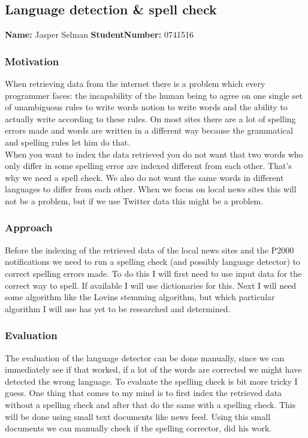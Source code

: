 \subsection{Language detection \& spell check}
\textbf{Name:} Jasper Selman \indent \textbf{StudentNumber:} 0741516

\subsubsection*{Motivation}
When retrieving data from the internet there is a problem which every programmer faces: the incapability of the human being to agree on one single set of unambiguous rules to write words notion to write words and the ability to actually write according to these rules. On most sites there are a lot of spelling errors made and words are written in a different way because the grammatical and spelling rules let him do that. \\
When you want to index the data retrieved you do not want that two words who only differ in some spelling error are indexed different from each other. That's why we need a spell check. We also do not want the same words in different languages to differ from each other. When we focus on local news sites this will not be a problem, but if we use Twitter data this might be a problem.

\subsubsection*{Approach}
Before the indexing of the retrieved data of the local news sites and the P2000 notifications we need to run a spelling check (and possibly language detector) to correct spelling errors made. To do this I will first need to use input data for the correct way to spell. If available I will use dictionaries for this. Next I will need some algorithm like the Lovins stemming algorithm, but which particular algorithm I will use has yet to be researched and determined. 

\subsubsection*{Evaluation }
The evaluation of the language detector can be done manually, since we can immediately see if that worked, if a lot of the words are corrected we might have detected the wrong language. To evaluate the spelling check is bit more tricky I guess. One thing that comes to my mind is to first index the retrieved data without a spelling check and after that do the same with a spelling check. This will be done using small text documents like news feed. Using this small documents we can manually check if the spelling corrector, did his work.
